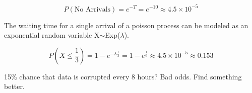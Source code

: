 \documentclass[12pt]{article}
\begin{document}
\begin{enumerate}
\begin{enumerate}
        \[P(\text{No Arrivals}) = e^{-T} = e^{-10} \approx 4.5 \times 10^{-5}\]

        The waiting time for a single arrival of a poisson process can be modeled as an exponential random variable X$\sim$Exp($\lambda$).

        \[P(X \le \frac{1}{3}) = 1-e^{-\lambda\frac{1}{3}} = 1-e^{\frac{1}{6}} \approx 4.5 \times 10^{-5} \approx 0.153\]

        15\% chance that data is corrupted every 8 hours? Bad odds. Find something better.

    \end{enumerate}
    
\end{enumerate}
\end{document}
